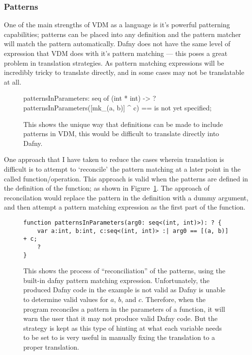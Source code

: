\documentclass{entcs}
\begin{document}
\subsubsection{Patterns}\label{section:pattern_problems}

One of the main strengths of VDM as a language is it's powerful patterning capabilities; patterns can be placed into any definition and the pattern matcher will match the pattern automatically. Dafny does not have the same level of expression that VDM does with it's pattern matching --- this poses a great problem in translation strategies. As pattern matching expressions will be incredibly tricky to translate directly, and in some cases may not be translatable at all. 

\begin{figure}[h]
	\begin{center}
        \begin{vdmsl}
patternsInParameters: seq of (int * int) -> ?
patternsInParameters([mk_(a, b)] ^ c) == is not yet specified;
        \end{vdmsl}
		\caption{This shows the unique way that definitions can be made to include patterns in VDM, this would be difficult to translate directly into Dafny.}\label{fig:vdm_patterning}
	\end{center}
\end{figure}

One approach that I have taken to reduce the cases wherein translation is difficult is to attempt to `reconcile' the pattern matching at a later point in the called function/operation. This approach is valid when the patterns are defined in the definition of the function; as shown in Figure~\ref{fig:vdm_patterning}. The approach of reconcilation would replace the pattern in the definition with a dummy argument, and then attempt a pattern matching expression as the first part of the function. 

\begin{figure}[h]
	\begin{center}
        \begin{lstlisting}
function patternsInParameters(arg0: seq<(int, int)>): ? {
    var a:int, b:int, c:seq<(int, int)> :| arg0 == [(a, b)] + c;
    ?
}
        \end{lstlisting}
		\caption{This shows the process of ``reconciliation'' of the patterns, using the built-in dafny pattern matching expression. Unfortunately, the produced Dafny code in the example is not valid as Dafny is unable to determine valid values for $a$, $b$, and $c$. Therefore, when the program reconciles a pattern in the parameters of a function, it will warn the user that it may not produce valid Dafny code. But the strategy is kept as this type of hinting at what each variable needs to be set to is very useful in manually fixing the translation to a proper translation.}\label{fig:dafny_patterning}
	\end{center}
\end{figure}
\end{document}
